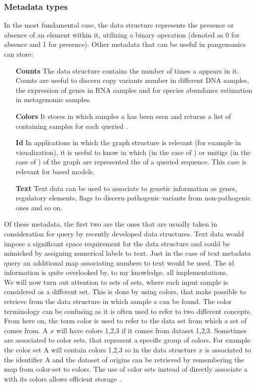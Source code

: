 \subsubsection{Metadata types}
In the most fundamental case, the data structure represents the presence or absence of an element within it, utilizing a binary \memb operation (denoted as 0 for absence and 1 for presence). Other metadata that can be useful in pangenomics can store:
\begin{itemize}
	\item[\textbf{Counts}] The data structure contains the number of times a \kmer appears in it. Counts are useful to discern copy variants number in different DNA samples, the expression of genes in RNA samples and for species abundance estimation in metagenomic samples.
	\item[\textbf{Colors}] It stores in which samples a \kmer has been seen and returns a list of containing samples for each queried \kmer.
	\item[\textbf{Id}] In applications in which the graph structure is relevant (for example in visualization), it is useful to know in which \kmers (in the case of \dbg) or unitigs (in the case of \cdbg) of the graph are represented the \kmers of a queried sequence. This case is relevant for \dbg based models.
	\item[\textbf{Text}] Text data can be used to associate \kmers to genetic information as genes, regulatory elements, flags to discern pathogenic variants from non-pathogenic ones and so on.
\end{itemize}
Of these metadata, the first two are the ones that are usually taken in consideration for query by recently developed data structures. Text data would impose a significant space requirement for the data structure and could be mimicked by assigning numerical labels to text. Just in the case of text metadata query an additional map associating numbers to text would be used. The id information is quite overlooked by, to my knowledge, all implementations.\\
We will now turn out attention to sets of \kmer sets, where each input sample is considered as a different set. This is done by using colors, that make possible to retrieve from the data structure in which sample a \kmer can be found. The color terminology can be confusing as it is often used to refer to two different concepts. From here on, the term color is used to refer to the data set from which a set of \kmer comes from. A \kmer $x$ will have colors 1,2,3 if it comes from dataset 1,2,3. Sometimes \kmers are associated to color sets, that represent a specific group of colors. For example the color set A will contain colors 1,2,3 so in the data structure \kmer $x$ is associated to the identifier A and the dataset of origins can be retrieved by remembering the map from color-set to colors. The use of color sets instead of directly associate a \kmer with its colors allows efficient storage~\cite{ggcat}. 

